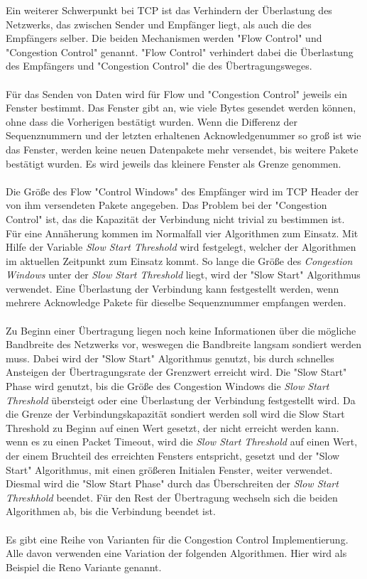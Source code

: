Ein weiterer Schwerpunkt bei TCP ist das Verhindern der Überlastung des Netzwerks, das zwischen Sender und Empfänger liegt, als auch die des Empfängers selber. 
Die beiden Mechanismen werden {}"Flow Control"{} und {}"Congestion Control"{} genannt. 
{}"Flow Control{}" verhindert dabei die Überlastung des Empfängers und {}"Congestion Control{}" die des Übertragungsweges. \\\\
Für das Senden von Daten wird für Flow und {}"Congestion Control{}" jeweils ein Fenster bestimmt. Das Fenster gibt an, wie viele Bytes gesendet werden können, ohne dass die Vorherigen bestätigt wurden. Wenn die Differenz der Sequenznummern und der letzten erhaltenen Acknowledgenummer so groß ist wie das Fenster, werden keine neuen Datenpakete mehr versendet, bis weitere Pakete bestätigt wurden. Es wird jeweils das kleinere Fenster als Grenze genommen. \\\\
Die Größe des Flow {}"Control Windows{}" des Empfänger wird im TCP Header der von ihm versendeten Pakete angegeben. 
Das Problem bei der {}"Congestion Control{}" ist, das die Kapazität der Verbindung nicht trivial zu bestimmen ist. Für eine Annäherung kommen im Normalfall vier Algorithmen zum Einsatz. Mit Hilfe der Variable \textit{Slow Start Threshold} wird festgelegt, welcher der Algorithmen im aktuellen Zeitpunkt zum Einsatz kommt. So lange die Größe des \textit{Congestion Windows} unter der \textit{Slow Start Threshold} liegt, wird der {}"Slow Start"{} Algorithmus verwendet. Eine Überlastung der Verbindung kann festgestellt werden, wenn mehrere Acknowledge Pakete für dieselbe Sequenznummer empfangen werden.\\\\
Zu Beginn einer Übertragung liegen noch keine Informationen über die mögliche Bandbreite des Netzwerks vor, weswegen die Bandbreite langsam sondiert werden muss. Dabei wird der {}"Slow Start"{} Algorithmus genutzt, bis durch schnelles Ansteigen der Übertragungsrate der Grenzwert erreicht wird. Die {}"Slow Start"{} Phase wird genutzt, bis die Größe des Congestion Windows die \textit{Slow Start Threshold} übersteigt oder eine Überlastung der Verbindung festgestellt wird. Da die Grenze der Verbindungskapazität sondiert werden soll wird die Slow Start Threshold zu Beginn auf einen Wert gesetzt, der nicht erreicht werden kann. wenn es zu einen Packet Timeout, wird die \textit{Slow Start Threshold} auf einen Wert, der einem Bruchteil des erreichten Fensters entspricht, gesetzt und der {}"Slow Start"{} Algorithmus, mit einen größeren Initialen Fenster, weiter verwendet. Diesmal wird die {}"Slow Start Phase"{} durch das Überschreiten der \textit{Slow Start Threshhold} beendet. Für den Rest der Übertragung wechseln sich die beiden Algorithmen ab, bis die Verbindung beendet ist.\\\\
Es gibt eine Reihe von Varianten für die Congestion Control Implementierung. Alle davon verwenden eine Variation der folgenden Algorithmen. Hier wird als Beispiel die Reno Variante genannt.

